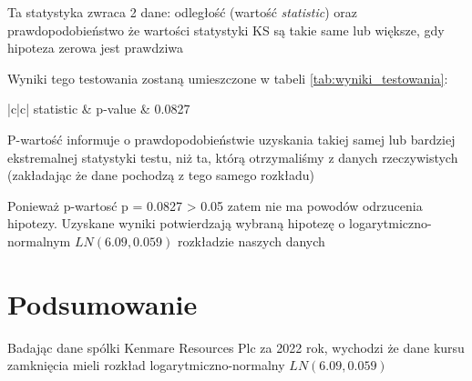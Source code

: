 \documentclass[a4paper,11pt]{article}
\def\\{\hfill\break}
\begin{document}
Ta statystyka zwraca 2 dane: odległość (wartość \textit{statistic}) oraz prawdopodobieństwo że wartości statystyki KS są takie same lub większe, gdy hipoteza zerowa jest prawdziwa

Wyniki tego testowania zostaną umieszczone w tabeli \ref{tab:wyniki_testowania}:

\begin{table}[h]
  \centering
  \begin{tabular}{|c|c|}
    \hline
     statistic & p-value   \\
      & 0.0827\\
    \hline
  \end{tabular}
  \caption{Wartość statystyki KS w testowaniu hipotezy}
  \label{tab:wyniki_testowania}
\end{table}


P-wartość informuje o prawdopodobieństwie uzyskania takiej samej lub bardziej ekstremalnej statystyki testu, niż ta, którą otrzymaliśmy z danych rzeczywistych (zakładając że dane pochodzą z tego samego rozkładu)

Ponieważ p-wartosć  p = 0.0827 > 0.05 zatem nie ma powodów odrzucenia hipotezy. Uzyskane wyniki potwierdzają wybraną hipotezę  o logarytmiczno-normalnym $LN(6.09, 0.059)$ rozkładzie naszych danych



\section{Podsumowanie}
Badając dane spólki Kenmare Resources Plc za 2022 rok, wychodzi że dane kursu zamknięcia mieli rozkład logarytmiczno-normalny $LN(6.09, 0.059)$
\end{document}
